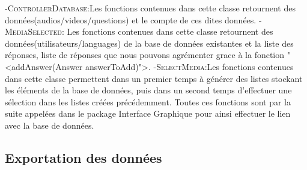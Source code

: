 	-\textsc{ControllerDatabase}:Les fonctions contenues dans cette classe retournent des données(audios/videos/questions) et le compte de ces dites données.
	-\textsc{MediaSelected}: Les fonctions contenues dans cette classe retournent des données(utilisateurs/languages) de la base de données existantes et la liste des réponses, liste de réponses que nous pouvons agrémenter grace à la fonction "<addAnswer(Answer answerToAdd)">.
	-\textsc{SelectMedia}:Les fonctions contenues dans cette classe permettent dans un premier temps à générer des listes stockant les éléments de la base de données, puis dans un second temps d'effectuer une sélection dans les listes créées précédemment.
	Toutes ces fonctions sont par la suite appelées dans le package Interface Graphique pour ainsi effectuer le lien avec la base de données.
	
\subsection{Exportation des données}
\lipsum[8]